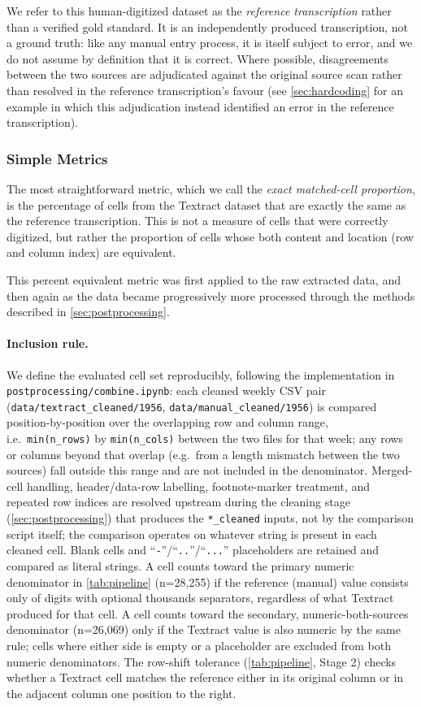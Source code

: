 \documentclass[12pt]{article}
\begin{document}
We refer to this human-digitized dataset as the \emph{reference transcription} rather than a verified gold standard. It is an independently produced transcription, not a ground truth: like any manual entry process, it is itself subject to error, and we do not assume by definition that it is correct. Where possible, disagreements between the two sources are adjudicated against the original source scan rather than resolved in the reference transcription's favour (see \cref{sec:hardcoding} for an example in which this adjudication instead identified an error in the reference transcription).

\subsubsection{Simple Metrics}
The most straightforward metric, which we call the \emph{exact matched-cell proportion}, is the percentage of cells from the Textract dataset that are exactly the same as the reference transcription. This is not a measure of cells that were correctly digitized, but rather the proportion of cells whose both content and location (row and column index) are equivalent.

This percent equivalent metric was first applied to the raw extracted data, and then again
as the data became progressively more processed through the methods described in \cref{sec:postprocessing}.

\paragraph{Inclusion rule.} We define the evaluated cell set reproducibly, following the implementation in \texttt{postprocessing/combine.ipynb}: each cleaned weekly CSV pair (\texttt{data/textract\_cleaned/1956}, \texttt{data/manual\_cleaned/1956}) is compared position-by-position over the overlapping row and column range, i.e.\ \texttt{min(n\_rows)} by \texttt{min(n\_cols)} between the two files for that week; any rows or columns beyond that overlap (e.g.\ from a length mismatch between the two sources) fall outside this range and are not included in the denominator. Merged-cell handling, header/data-row labelling, footnote-marker treatment, and repeated row indices are resolved upstream during the cleaning stage (\cref{sec:postprocessing}) that produces the \texttt{*\_cleaned} inputs, not by the comparison script itself; the comparison operates on whatever string is present in each cleaned cell. Blank cells and ``\texttt{-}''/``\texttt{..}''/``\texttt{...}'' placeholders are retained and compared as literal strings. A cell counts toward the primary numeric denominator in \cref{tab:pipeline} (n=28,255) if the reference (manual) value consists only of digits with optional thousands separators, regardless of what Textract produced for that cell. A cell counts toward the secondary, numeric-both-sources denominator (n=26,069) only if the Textract value is also numeric by the same rule; cells where either side is empty or a placeholder are excluded from both numeric denominators. The row-shift tolerance (\cref{tab:pipeline}, Stage 2) checks whether a Textract cell matches the reference either in its original column or in the adjacent column one position to the right.
\end{document}
